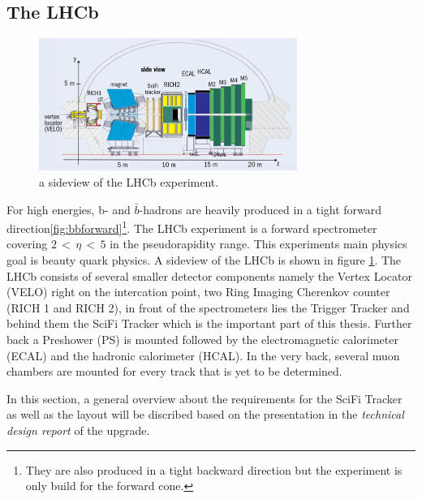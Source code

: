 \subsection{The LHCb}

\begin{figure}
  \centering
  \includegraphics[width=0.75\textwidth]{plots/LHCb_facility.jpg}
  \caption{a sideview of the LHCb experiment.}
  \label{fig:LHCb}
\end{figure}

For high energies, b- and $\bar{b}$-hadrons are heavily produced in a tight forward
direction\ref{fig:bbforward}\footnote{They are also produced in a tight backward
direction but the experiment is only build for the forward cone.}.
The LHCb experiment\cite{lhcbInfo} is a forward spectrometer covering
$2 \,<\, \eta \,<\, 5$ in the pseudorapidity range. This experiments main
physics goal is beauty quark physics. A sideview of
the LHCb is shown in figure \ref{fig:LHCb}.
The LHCb consists of several smaller detector components namely the Vertex Locator
(VELO) right on the intercation point, two Ring Imaging Cherenkov counter
(RICH 1 and RICH 2), in front of the spectrometers lies the Trigger Tracker and
behind them the SciFi Tracker which is the important part of this thesis. Further
back a Preshower (PS) is mounted followed
by the electromagnetic calorimeter (ECAL) and the hadronic calorimeter (HCAL).
In the very back, several muon chambers are mounted for every track that is yet
to be determined.



In this section, a general overview about the requirements for the SciFi Tracker as well as the layout will be discribed based on the presentation in the \textit{technical design report}\cite{scifiInfo} of the upgrade.

